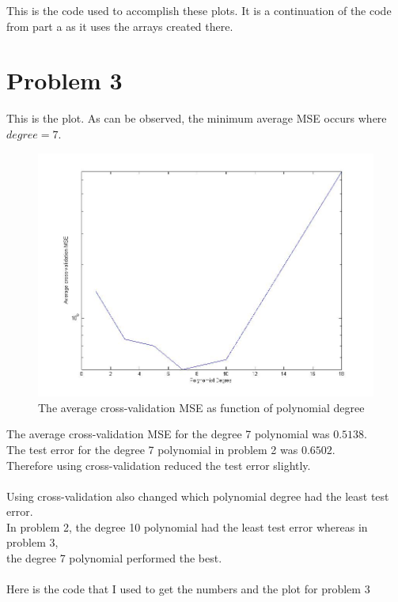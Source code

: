 \documentclass[twoside,11pt]{article}
\theoremstyle{definition}
\begin{document}
\newpage

This is the code used to accomplish these plots. It is a continuation of the code from part a as it uses the arrays created there. 


\newpage

\section*{Problem 3}

This is the plot. As can be observed, the minimum average MSE occurs where $degree=7$. \\
\begin{figure}[h]
\centering
\includegraphics[width=5 in]{prob2Plot.jpg}
\caption{The average cross-validation MSE as function of polynomial degree}
\end{figure}
The average cross-validation MSE for the degree 7 polynomial was $0.5138$.\\
The test error for the degree 7 polynomial in problem 2 was $0.6502$.\\
Therefore using cross-validation reduced the test error slightly.\\
\\
Using cross-validation also changed which polynomial degree had the least test error. \\
In problem 2, the degree 10 polynomial had the least test error whereas in problem 3, \\
the degree 7 polynomial performed the best. \\
\\
\newpage
Here is the code that I used to get the numbers and the plot for problem 3

\end{document}
